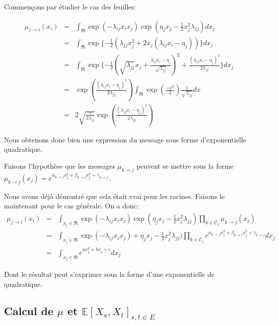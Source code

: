 \documentclass{article}
\begin{document}
Commençons par étudier le cas des feuilles:

\begin{align}
\mu_{j \rightarrow i}(x_i) & = & \int_{\Re} \exp(- \lambda_{ij} x_i x_j) \exp( \eta_j x_j - \frac{1}{2} x_j ^2\lambda_{jj}) dx_j \\
			   & = & \int_{\Re} \exp \{ - \frac{1}{2} (\lambda_{jj}x_j^2 + 2x_j(\lambda_{ij}x_i - \eta_j) )\} dx_j \\
			   & = & \int_{\Re} \exp \{ - \frac{1}{2} (\sqrt{\lambda_{jj}}x_j + \frac{\lambda_{ij}x_i - \eta_j}{\sqrt{\lambda_{jj}}})^2 + \frac{(\lambda_{ij}x_i - \eta_j)^2}{2\lambda_{jj}}\} dx_j \\
			   & = & \exp(\frac{(\lambda_{ij}x_i - \eta_j)^2}{2\lambda_{jj}}) \int_{\Re} \exp(\frac{-x^2}{2}) \frac{1}{\sqrt{\lambda_{jj}}}dx \\
			   & = & 2 \sqrt{\frac{\pi}{2 \lambda_{jj}}}\exp(\frac{(\lambda_{ij}x_i - \eta_j)^2}{2\lambda_{jj}})
\end{align}

Nous obtenons donc bien une expression du message sous forme d'exponentielle quadratique.

Faisons l'hypothèse que les messages $\mu_{k \rightarrow j}$ peuvent se mettre
sous la forme $\mu_{k \rightarrow j}(x_j) = e^{\alpha_{k \rightarrow j} x_j^2 +
\beta_{k \rightarrow i} x_j^2  + \gamma_{k \rightarrow j}}$.

Nous avons déjà démontré que cela était vrai pour les racines. Faisons le maintenant pour le cas générale.
On a donc:
\begin{align}
\mu_{j \rightarrow i}(x_i) & = & \int_{x_j \in \Re} \exp(- \lambda_{ij} x_i x_j) \exp(\eta_j x_j - \frac{1}{2} x_j ^2\lambda_{jj}) \prod_{k \in \mathcal{C}_j} \mu_{k \rightarrow j}(x_j) \\
			   & = & \int_{x_j \in \Re} \exp(- \lambda_{ij} x_i x_j) + \eta_j x_j - \frac{1}{2} x_j ^2\lambda_{jj}) \prod_{k \in \mathcal{C}_j} e^{\alpha_{k \rightarrow j} x_j^2 + \beta_{k \rightarrow i} x_j^2  + \gamma_{k \rightarrow j}} dx_j \\
			   & = & \int_{x_j \in \Re} e^{a x_j^2 + b x_j  + c} dx_j
\end{align}

Dont le résultat peut s'exprimer sous la forme d'une exponentielle de quadratique.

\subsection{Calcul de $\mu$ et $\mathbb{E}[X_s, X_t]_{s, t \in E}$}
\end{document}
